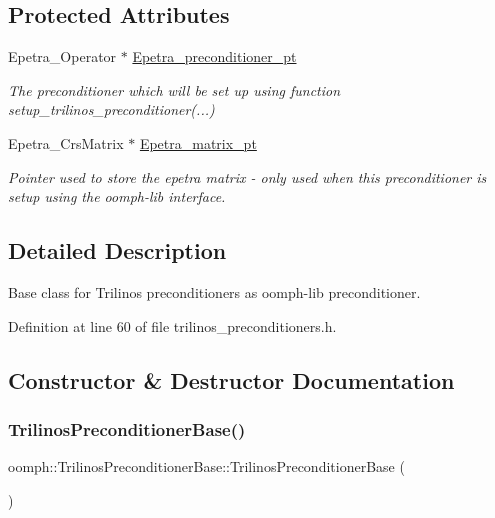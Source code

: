 \subsection*{Protected Attributes}
\begin{DoxyCompactItemize}
\item 
Epetra\+\_\+\+Operator $\ast$ \hyperlink{classoomph_1_1TrilinosPreconditionerBase_a082fb118f5c9cb80daffba53d85a74d8}{Epetra\+\_\+preconditioner\+\_\+pt}
\begin{DoxyCompactList}\small\item\em The preconditioner which will be set up using function setup\+\_\+trilinos\+\_\+preconditioner(...) \end{DoxyCompactList}\item 
Epetra\+\_\+\+Crs\+Matrix $\ast$ \hyperlink{classoomph_1_1TrilinosPreconditionerBase_a515a6df2a535337d520cfe98bdcd38f4}{Epetra\+\_\+matrix\+\_\+pt}
\begin{DoxyCompactList}\small\item\em Pointer used to store the epetra matrix -\/ only used when this preconditioner is setup using the oomph-\/lib interface. \end{DoxyCompactList}\end{DoxyCompactItemize}


\subsection{Detailed Description}
Base class for Trilinos preconditioners as oomph-\/lib preconditioner. 

Definition at line 60 of file trilinos\+\_\+preconditioners.\+h.



\subsection{Constructor \& Destructor Documentation}
\mbox{\label{classoomph_1_1TrilinosPreconditionerBase_aebe14e80ad9c0323ea4faf568743b204}} 
\subsubsection{\texorpdfstring{Trilinos\+Preconditioner\+Base()}{TrilinosPreconditionerBase()}\hspace{0.1cm}{\footnotesize\ttfamily [1/2]}}
{\footnotesize\ttfamily oomph\+::\+Trilinos\+Preconditioner\+Base\+::\+Trilinos\+Preconditioner\+Base (\begin{DoxyParamCaption}{ }\end{DoxyParamCaption})\hspace{0.3cm}{\ttfamily [inline]}}



